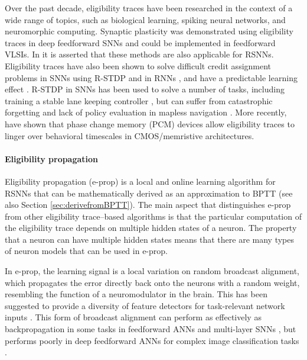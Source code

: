 Over the past decade, eligibility traces have been researched in the context of a wide range of topics, such as biological learning, spiking neural networks, and neuromorphic computing.
Synaptic plasticity was demonstrated using eligibility traces in deep feedforward SNNs \citep{zenke2018superspike,neftci2017event,kaiser2020synaptic} and could be implemented in feedforward VLSIs.
In \citet{zenke2018superspike} it is asserted that these methods are also applicable for RSNNs.
Eligibility traces have also been shown to solve difficult credit assignment problems in SNNs using R-STDP \citep{legenstein2008learning, bellec2020solution} and in RNNs \citep{he2015distinct}, and have a predictable learning effect \citep{legenstein2008learning}.
R-STDP in SNNs has been used to solve a number of tasks, including training a stable lane keeping controller \citep{bing2020indirect}, but can suffer from catastrophic forgetting and lack of policy evaluation in mapless navigation \citep{bing2018end}.
More recently, \citet{demirag2021pcm} have shown that phase change memory (PCM) devices allow eligibility traces to linger over behavioral timescales in CMOS/memristive architectures.

\paragraph{Eligibility propagation}
Eligibility propagation (e-prop) \citep{bellec2020solution} is a local and online learning algorithm for RSNNs that can be mathematically derived as an approximation to BPTT (see also Section \ref{sec:derivefromBPTT}).
The main aspect that distinguishes e-prop from other eligibility trace--based algorithms is that the particular computation of the eligibility trace depends on multiple hidden states of a neuron.
The property that a neuron can have multiple hidden states means that there are many types of neuron models that can be used in e-prop.

In e-prop, the learning signal is a local variation on random broadcast alignment, which propagates the error directly back onto the neurons with a random weight, resembling the function of a neuromodulator in the brain.
This has been suggested to provide a diversity of feature detectors for task-relevant network inputs \citep{bellec2020solution}.
This form of broadcast alignment can perform as effectively as backpropagation in some tasks in feedforward ANNs \citep{lillicrap2016random,nokland2016direct} and multi-layer SNNs \citep{samadi2017deep,clopath2010connectivity}, but performs poorly in deep feedforward ANNs for complex image classification tasks \citep{bartunov2018assessing}.

